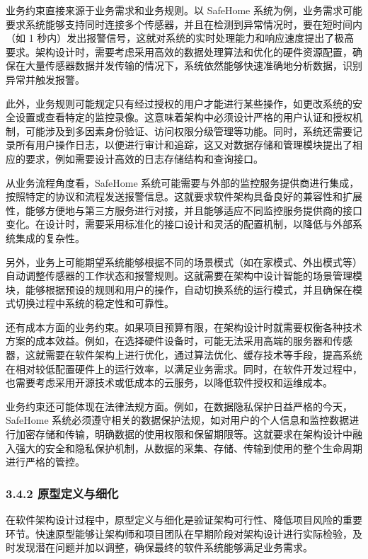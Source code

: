 业务约束直接来源于业务需求和业务规则。以 SafeHome 系统为例，业务需求可能要求系统能够支持同时连接多个传感器，并且在检测到异常情况时，要在短时间内（如 1 秒内）发出报警信号，这就对系统的实时处理能力和响应速度提出了极高要求。架构设计时，需要考虑采用高效的数据处理算法和优化的硬件资源配置，确保在大量传感器数据并发传输的情况下，系统依然能够快速准确地分析数据，识别异常并触发报警。

此外，业务规则可能规定只有经过授权的用户才能进行某些操作，如更改系统的安全设置或查看特定的监控录像。这意味着架构中必须设计严格的用户认证和授权机制，可能涉及到多因素身份验证、访问权限分级管理等功能。同时，系统还需要记录所有用户操作日志，以便进行审计和追踪，这又对数据存储和管理模块提出了相应的要求，例如需要设计高效的日志存储结构和查询接口。

从业务流程角度看，SafeHome 系统可能需要与外部的监控服务提供商进行集成，按照特定的协议和流程发送报警信息。这就要求软件架构具备良好的兼容性和扩展性，能够方便地与第三方服务进行对接，并且能够适应不同监控服务提供商的接口变化。在设计时，需要采用标准化的接口设计和灵活的配置机制，以降低与外部系统集成的复杂性。

另外，业务上可能期望系统能够根据不同的场景模式（如在家模式、外出模式等）自动调整传感器的工作状态和报警规则。这就需要在架构中设计智能的场景管理模块，能够根据预设的规则和用户的操作，自动切换系统的运行模式，并且确保在模式切换过程中系统的稳定性和可靠性。

还有成本方面的业务约束。如果项目预算有限，在架构设计时就需要权衡各种技术方案的成本效益。例如，在选择硬件设备时，可能无法采用高端的服务器和传感器，这就需要在软件架构上进行优化，通过算法优化、缓存技术等手段，提高系统在相对较低配置硬件上的运行效率，以满足业务需求。同时，在软件开发过程中，也需要考虑采用开源技术或低成本的云服务，以降低软件授权和运维成本。

业务约束还可能体现在法律法规方面。例如，在数据隐私保护日益严格的今天，SafeHome 系统必须遵守相关的数据保护法规，如对用户的个人信息和监控数据进行加密存储和传输，明确数据的使用权限和保留期限等。这就要求在架构设计中融入强大的安全和隐私保护机制，从数据的采集、存储、传输到使用的整个生命周期进行严格的管控。

\hypertarget{ux539fux578bux5b9aux4e49ux4e0eux7ec6ux5316}{%
\subsubsection{3.4.2 原型定义与细化}\label{ux539fux578bux5b9aux4e49ux4e0eux7ec6ux5316}}

在软件架构设计过程中，原型定义与细化是验证架构可行性、降低项目风险的重要环节。快速原型能够让架构师和项目团队在早期阶段对架构设计进行实际检验，及时发现潜在问题并加以调整，确保最终的软件系统能够满足业务需求。

